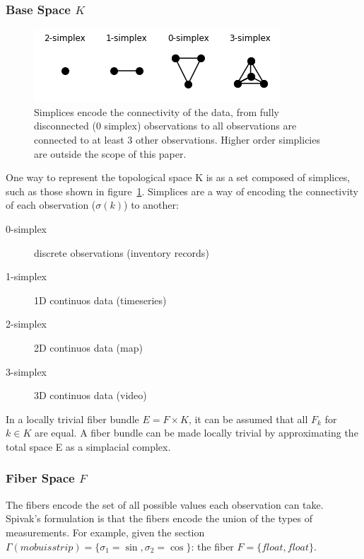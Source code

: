\documentclass[../intro.tex]{subfiles}
\begin{document}
\subsubsection{Base Space $K$}

\begin{figure}[ht]
    \label{fig:simplex}
    \includegraphics{figures/sections/math/simplex.png}
    \caption{Simplices encode the connectivity of the data, from fully disconnected (0 simplex) observations to all observations are connected to at least 3 other observations. Higher order simplicies are outside the scope of this paper.}
\end{figure}

One way to represent the topological space K is as a set composed of simplices, such as those shown in figure~\ref{fig:simplex}. Simplices are a way of encoding the connectivity of each observation ($\sigma(k)$) to another:

\begin{description}
    \item[0-simplex] discrete observations (inventory records)
    \item[1-simplex] 1D continuos data (timeseries)
    \item[2-simplex] 2D continuos data (map)
    \item[3-simplex] 3D continuos data (video)
\end{description}

In a locally trivial fiber bundle $E = F \times K$, it can be assumed that all $F_{k}$ for $k \in K$ are equal. A fiber bundle can be made locally trivial by approximating the total space E as a simplacial complex.

\subsubsection{Fiber Space $F$}
The fibers encode the set of all possible values each observation can take.  Spivak's formulation is that the fibers encode the union of the types of measurements\cite{spivakSIMPLICIALDATABASES}. For example, given the section $\Gamma(mobuis strip) =
\{\sigma_1=\sin, \sigma_2=\cos\}$:
the fiber $F = \{float, float\}$.  
\end{document}
